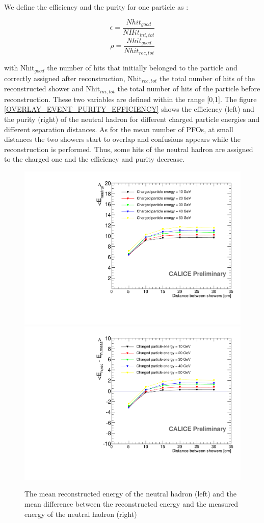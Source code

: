 \documentclass[cits]{JINST}
\begin{document}
We define the efficiency and the purity for one particle as :

\begin{equation}
  \epsilon = \frac{Nhit_{good}}{NHit_{ini,tot}}
\end{equation}
\begin{equation}
  \rho = \frac{Nhit_{good}}{Nhit_{rec,tot}}
\end{equation}

with Nhit$_{good}$ the number of hits that initially belonged to the particle and correctly assigned after reconstruction, Nhit$_{rec,tot}$ the total number of hits of the reconstructed shower and Nhit$_{ini,tot}$ the total number of hits of the particle before reconstruction. These two variables are defined within the range [0,1]. The figure \ref{OVERLAY_EVENT_PURITY_EFFICIENCY} shows the efficiency (left) and the purity (right) of the neutral hadron for different charged particle energies and different separation distances. As for the mean number of PFOs, at small distances the two showers start to overlap and confusions appears while the reconstruction is performed. Thus, some hits of the neutral hadron are assigned to the charged one and the efficiency and purity decrease.

\begin{figure}[!h]
  \begin{center}
    \includegraphics[width=0.47\linewidth]{plots/OverlayEvent_NeutralEnergyMean.pdf}
    \includegraphics[width=0.47\linewidth]{plots/OverlayEvent_NeutralEnergyDifferenceMean.pdf}
  \end{center}
  \caption{\label{OVERLAY_EVENT_EREC} The mean reconstructed energy of the neutral hadron (left) and the mean difference between the reconstructed energy and the measured energy of the neutral hadron (right)}
\end{figure}
\end{document}
